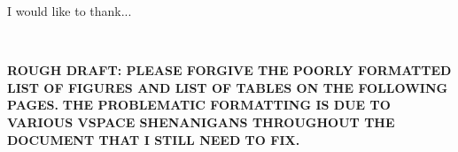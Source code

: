 
I would like to thank...

~

\noindent \textbf{ROUGH DRAFT: PLEASE FORGIVE THE POORLY FORMATTED LIST OF FIGURES AND LIST OF TABLES ON THE FOLLOWING PAGES.}
\textbf{THE PROBLEMATIC FORMATTING IS DUE TO VARIOUS VSPACE SHENANIGANS THROUGHOUT THE DOCUMENT THAT I STILL NEED TO FIX.}

